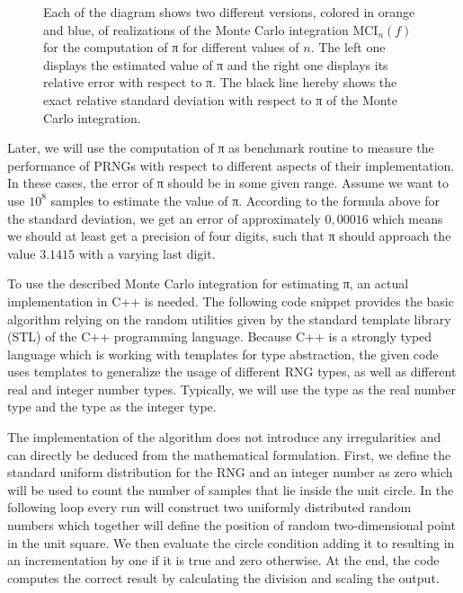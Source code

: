 \documentclass{stdlocal}
\begin{document}
\begin{figure}
\begin{subfigure}[b]{0.49\linewidth}
      \end{subfigure}
      \caption[Monte Carlo Integration Plots for the Computation of π]{%
        Each of the diagram shows two different versions, colored in orange and blue, of realizations of the Monte Carlo integration $\mathrm{MCI}_n(f)$ for the computation of π for different values of $n$.
        The left one displays the estimated value of π and the right one displays its relative error with respect to π.
        The black line hereby shows the exact relative standard deviation with respect to π of the Monte Carlo integration.
      }
      \label{fig:pi-computation-plots}
    \end{figure}

    Later, we will use the computation of π as benchmark routine to measure the performance of PRNGs with respect to different aspects of their implementation.
    In these cases, the error of π should be in some given range.
    Assume we want to use $10^8$ samples to estimate the value of π.
    According to the formula above for the standard deviation, we get an error of approximately $0,00016$ which means we should at least get a precision of four digits, such that π should approach the value $3.1415$ with a varying last digit.

    To use the described Monte Carlo integration for estimating π, an actual implementation in C++ is needed.
    The following code snippet provides the basic algorithm relying on the random utilities given by the standard template library (STL) of the C++ programming language.
    Because C++ is a strongly typed language which is working with templates for type abstraction, the given code uses templates to generalize the usage of different RNG types, as well as different real and integer number types.
    Typically, we will use the  type as the real number type and the  type as the integer type.

    The implementation of the algorithm does not introduce any irregularities and can directly be deduced from the mathematical formulation.
    First, we define the standard uniform distribution for the RNG and an integer number  as zero which will be used to count the number of samples that lie inside the unit circle.
    In the following  loop every run will construct two uniformly distributed random numbers which together will define the position of random two-dimensional point in the unit square.
    We then evaluate the circle condition adding it to  resulting in an incrementation by one if it is true and zero otherwise.
    At the end, the code computes the correct result by calculating the division and scaling the output.
\end{document}

